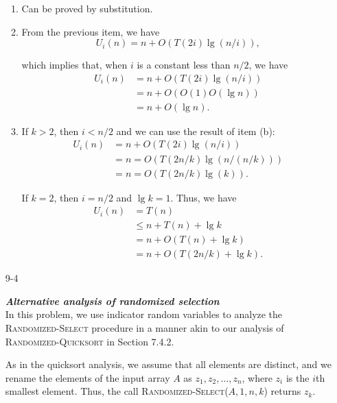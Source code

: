\begin{enumerate}
\begin{framed}
\begin{enumerate}
\item Can be proved by substitution.

\item From the previous item, we have
\[
  U_i(n) = n + O(T(2i) \lg(n/i)),
\]

which implies that, when $i$ is a constant less than $n/2$, we have
\begin{equation*}
\begin{aligned}
  U_i(n) &= n + O(T(2i) \lg(n/i))\\
         &= n + O(O(1) O(\lg n))\\
         &= n + O(\lg n).
\end{aligned}
\end{equation*}

\item If $k > 2$, then $i < n/2$ and we can use the result of item (b):
\begin{equation*}
\begin{aligned}
  U_i(n) &= n + O(T(2i)\lg(n/i))\\
         &= n = O(T(2n/k) \lg(n/(n/k)))\\
         &= n = O(T(2n/k) \lg(k)).
\end{aligned}
\end{equation*}

If $k = 2$, then $i = n/2$ and $\lg k = 1$. Thus, we have
\begin{equation*}
\begin{aligned}
  U_i(n) &=   T(n)\\
         &\le n + T(n) + \lg k\\
         &=   n + O(T(n) + \lg k)\\
         &=   n + O(T(2n/k) + \lg k).
\end{aligned}
\end{equation*}

\end{enumerate}
\end{framed}

\newpage

\item[9-4]{\textbf{\emph{Alternative analysis of randomized selection}}\\
In this problem, we use indicator random variables to analyze the
\textsc{Randomized-Select} procedure in a manner akin to our analysis of
\textsc{Randomized-Quicksort} in Section 7.4.2.

As in the quicksort analysis, we assume that all elements are distinct, and we
rename the elements of the input array $A$ as $z_1, z_2, \dots, z_n$, where
$z_i$ is the $i$th smallest element. Thus, the call
\textsc{Randomized-Select}($A, 1, n, k$) returns $z_k$.

}
\end{enumerate}
